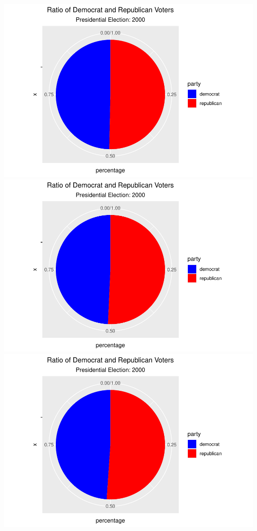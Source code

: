 \documentclass[
]{article}
\begin{document}
\includegraphics{election_files/figure-latex/anim-61.pdf}
\includegraphics{election_files/figure-latex/anim-62.pdf}
\includegraphics{election_files/figure-latex/anim-63.pdf}
\end{document}
